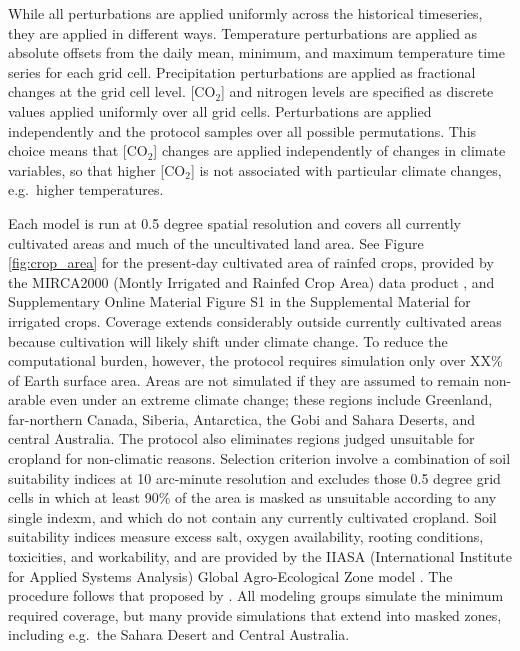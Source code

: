 \documentclass[gmd, manuscript]{copernicus} %
\begin{document}
While all perturbations are applied uniformly across the historical timeseries, they are applied in different ways. Temperature perturbations are applied as absolute offsets from the daily mean, minimum, and maximum temperature time series for each grid cell.
Precipitation perturbations are applied as fractional changes at the grid cell level. [CO$_2$] and nitrogen levels are specified as discrete values applied uniformly over all grid cells. 
Perturbations are applied independently and the protocol samples over all possible permutations. This choice means that [CO$_2$] changes are applied independently of changes in climate variables, so that higher [CO$_2$] is not associated with particular climate changes, e.g.\ higher temperatures. 

Each model is run at 0.5 degree spatial resolution and covers all currently cultivated areas and much of the uncultivated land area. See Figure \ref{fig:crop_area} for the present-day cultivated area of rainfed crops, provided by the MIRCA2000 (Montly Irrigated and Rainfed Crop Area) data product \citep{Portmann2010}, and Supplementary Online Material Figure S1 in the Supplemental Material for irrigated crops. 
Coverage extends considerably outside currently cultivated areas because cultivation will likely shift under climate change.  
To reduce the computational burden, however, the protocol requires simulation only over XX\% of Earth surface area.  
Areas are not simulated if they are assumed to remain non-arable even under an extreme climate change; these regions include Greenland, far-northern Canada, Siberia, Antarctica, the Gobi and Sahara Deserts, and central Australia. 
The protocol also eliminates regions judged unsuitable for cropland for non-climatic reasons. 
Selection criterion involve a combination of soil suitability indices at 10 arc-minute resolution and excludes those 0.5 degree grid cells in which at least 90\% of the area is masked as unsuitable according to any single indexm, and which do not contain any currently cultivated cropland. %
Soil suitability indices measure excess salt, oxygen availability, rooting conditions, toxicities, and workability, and are provided by the IIASA (International Institute for Applied Systems Analysis) Global Agro-Ecological Zone model \citep[GAEZ, ][]{gaez}. 
The procedure follows that proposed by \citet{pugh_climate_2016}. 
All modeling groups simulate the minimum required coverage, but many provide simulations that extend into masked zones, including e.g.\ the Sahara Desert and Central Australia.
\end{document}
